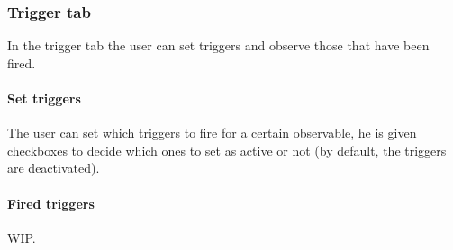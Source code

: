     \subsubsection{Trigger tab}
        In the trigger tab the user can set triggers and observe those that have been fired.

    \paragraph{Set triggers}
        The user can set which triggers to fire for a certain observable, he is given checkboxes to decide which ones to set as active or not (by default, the triggers are deactivated).

    \paragraph{Fired triggers}
        WIP.
